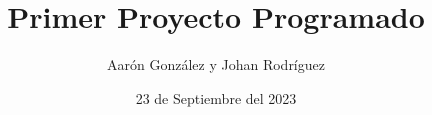 \documentclass{lib/preamble}
\begin{document}

\title{Primer Proyecto Programado}
\author{Aarón González y Johan Rodríguez}
\date{23 de Septiembre del 2023}

\maketitle





\end{document}
